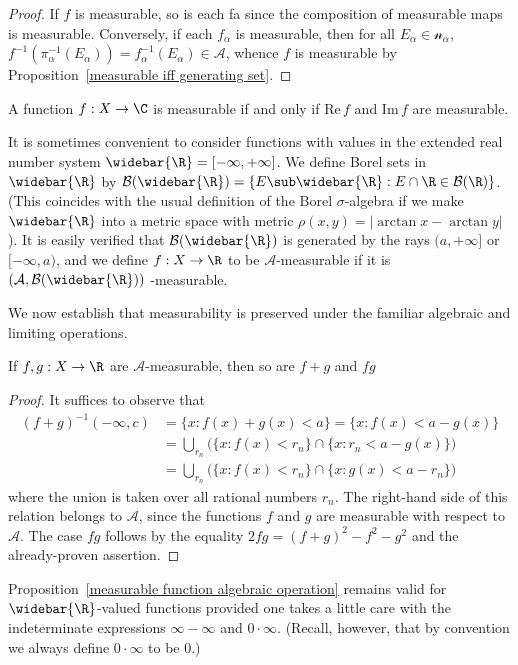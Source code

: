 \begin{proof}
If $f$ is measurable, so is each fa since the composition of measurable
maps is measurable. Conversely, if each $f_\alpha$ is measurable, then for all $E_\alpha\in\mathcal{n}_\alpha$, $f^{-1}(\pi^{-1}_\alpha(E_\alpha))=f_\alpha^{-1}(E_\alpha)\in\mathcal{A}$, whence $f$ is measurable by Proposition~\ref{measurable iff generating set}.
\end{proof}
\begin{corollary}\label{measurable complex function iff component}
A function $f:X\to\C$ is measurable if and only if $\mathrm{Re}\, f$ and $\mathrm{Im}\, f$ are measurable.
\end{corollary}
It is sometimes convenient to consider functions with values in the extended real number system $\widebar{\R}=[-\infty,+\infty]$. We define Borel sets in $\widebar{\R}$ by $\mathcal{B}(\widebar{\R})=\{E\sub\widebar{\R}:E\cap\R\in\mathcal{B}(\R)\}$. (This coincides with the usual definition of the Borel $\sigma$-algebra if we make $\widebar{\R}$ into a metric space with metric $\rho(x,y)=|\arctan x-\arctan y|$). It is easily verified that $\mathcal{B}(\widebar{\R})$ is generated by the rays $(a,+\infty]$ or $[-\infty,a)$, and we define $f:X\to\R$ to be $\mathcal{A}$-measurable if it is $(\mathcal{A},\mathcal{B}(\widebar{\R}))$ -measurable.\par
We now establish that measurability is preserved under the familiar algebraic and limiting operations.
\begin{proposition}\label{measurable function algebraic operation}
If $f,g:X\to\R$ are $\mathcal{A}$-measurable, then so are $f+g$ and $fg$
\end{proposition}
\begin{proof}
It suffices to observe that
\begin{align*}
(f+g)^{-1}(-\infty,c)&=\{x:f(x)+g(x)<a\}=\{x:f(x)<a-g(x)\}\\
&=\bigcup_{r_n}\Big(\{x:f(x)<r_n\}\cap\{x:r_n<a-g(x)\}\Big)\\
&=\bigcup_{r_n}\Big(\{x:f(x)<r_n\}\cap\{x:g(x)<a-r_n\}\Big)
\end{align*}
where the union is taken over all rational numbers $r_n$. The right-hand side of this relation belongs to $\mathcal{A}$, since the functions $f$ and $g$ are measurable with respect to $\mathcal{A}$. The case $fg$ follows by the equality $2fg=(f+g)^2-f^2-g^2$ and the already-proven assertion.
\end{proof}
\begin{remark}
Proposition~\ref{measurable function algebraic operation} remains valid for $\widebar{\R}$-valued functions provided one takes a little care with the indeterminate expressions $\infty-\infty$ and $0\cdot\infty$. (Recall, however, that by convention we always define $0\cdot\infty$ to be $0$.)
\end{remark}
